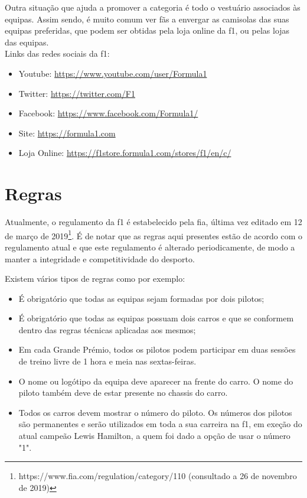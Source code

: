 \documentclass{report}
\begin{document}
Outra situação que ajuda a promover a categoria é todo o vestuário associados às equipas. Assim sendo, é muito comum ver fãs a envergar as camisolas das suas equipas preferidas, que podem ser obtidas pela loja online da \ac{f1}, ou pelas lojas das equipas.
\\
\newline
Links das redes sociais da \ac{f1}:
\begin{itemize}
    \item Youtube: \url{https://www.youtube.com/user/Formula1}
    \item Twitter: \url{https://twitter.com/F1}
    \item Facebook: \url{https://www.facebook.com/Formula1/}
    \item Site: \url{https://formula1.com}
    \item Loja Online: \url{https://f1store.formula1.com/stores/f1/en/c/}
\end{itemize}

\chapter{Regras}
\label{chap.regras}
\hspace{\parindent}Atualmente, o regulamento da \ac{f1} é estabelecido pela \ac{fia}, última vez editado em 12 de março de 2019\footnote[1]{https://www.fia.com/regulation/category/110 (consultado a 26 de novembro de 2019)}. É de notar que as regras aqui presentes estão de acordo com o regulamento atual e que este regulamento é alterado periodicamente, de modo a manter a integridade e competitividade do desporto.

Existem vários tipos de regras como por exemplo: \cite{wikipedia}
\begin{itemize}
   \item É obrigatório que todas as equipas sejam formadas por dois pilotos;
   \item É obrigatório que todas as equipas possuam dois carros e que se conformem dentro das regras técnicas aplicadas
   aos mesmos;
   \item Em cada Grande Prémio, todos os pilotos podem participar em duas sessões de treino livre de 1 hora e meia nas sextas-feiras.
   \item O nome ou logótipo da equipa deve aparecer na frente do carro. O nome do piloto também deve de estar presente no chassis do carro.
   \item Todos os carros devem mostrar o número do piloto. Os números dos pilotos são permanentes e serão utilizados em toda a sua carreira na \ac{f1}, em exeção do atual campeão Lewis Hamilton, a quem foi dado a opção de usar o número "1".
 \end{itemize}
\end{document}
